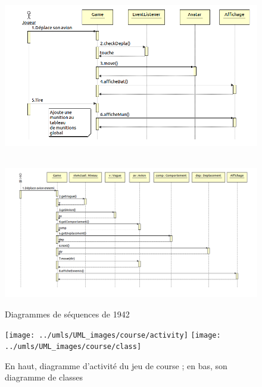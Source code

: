 \begin{figure}[h]
 \centering
 \includegraphics[height=8cm]{../umls/UML_images/Bat42/sequence} \hfill
 \includegraphics[width=\textwidth]{../umls/UML_images/Bat42/sequenceIA} \hfill
 \caption{Diagrammes de séquences de 1942}
\end{figure}

% 

\clearpage

\begin{figure}[h]
 \centering
 \texttt{[image: ../umls/UML\_images/course/activity]} \hfill
 \texttt{[image: ../umls/UML\_images/course/class]} \hfill
 \caption{En haut, diagramme d'activité du jeu de course ; en bas, son diagramme de classes}
\end{figure}

